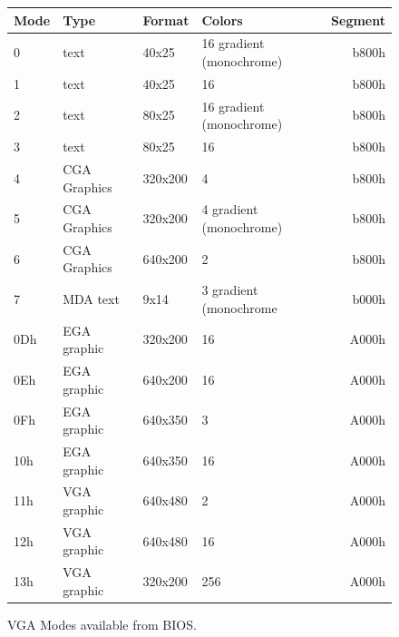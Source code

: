 \documentclass[book.tex]{subfiles}
\begin{document}
\begin{figure}[H]
\centering
\begin{table}[H]
\begin{tabular}{llllr}
\hline
\textbf{Mode} & \textbf{Type} & \textbf{Format} & \textbf{Colors}          & \multicolumn{1}{l}{\textbf{Segment}} \\ \hline
0             & text          & 40x25           & 16 gradient (monochrome) & b800h                                \\ \hline
1             & text          & 40x25           & 16                       & b800h                                \\ \hline
2             & text          & 80x25           & 16 gradient (monochrome) & b800h                                \\ \hline
3             & text          & 80x25           & 16                       & b800h                                \\ \hline
4             & CGA Graphics  & 320x200         & 4                        & b800h                                \\ \hline
5             & CGA Graphics  & 320x200         & 4 gradient (monochrome)  & b800h                                \\ \hline
6             & CGA Graphics  & 640x200         & 2                        & b800h                                \\ \hline
7             & MDA text      & 9x14            & 3 gradient (monochrome   & b000h                                \\ \hline
0Dh           & EGA graphic   & 320x200         & 16                       & A000h                                \\ \hline
0Eh           & EGA graphic   & 640x200         & 16                       & A000h                                \\ \hline
0Fh           & EGA graphic   & 640x350         & 3                        & A000h                                \\ \hline
10h           & EGA graphic   & 640x350         & 16                       & A000h                                \\ \hline
11h           & VGA graphic   & 640x480         & 2                        & A000h                                \\ \hline
12h           & VGA graphic   & 640x480         & 16                       & A000h                                \\ \hline
13h           & VGA graphic   & 320x200         & 256                      & A000h                                \\ \hline
\end{tabular}
\end{table}
\caption{VGA Modes available from BIOS.}\label{fig:vga_modes}
 \end{figure}
 
\end{document}
